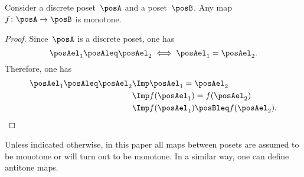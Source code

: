 \begin{lemma}
  Consider a discrete poset~$\posA$ and a poset~$\posB$. Any map~$f\colon \posA\to \posB$ is monotone.
\end{lemma}
\begin{proof}
  Since~$\posA$ is a discrete poset, one has
  \begin{equation}
    \posAel_1\posAleq \posAel_2 \iff \posAel_1=\posAel_2.
  \end{equation}
  Therefore, one has
  \begin{equation}
    \begin{aligned}
      \posAel_1\posAleq \posAel_2 &\Imp \posAel_1=\posAel_2\\
      &\Imp f(\posAel_1)=f(\posAel_2)\\
      &\Imp f(\posAel_1)\posBleq f(\posAel_2).
    \end{aligned}
  \end{equation}
\end{proof}
Unless indicated otherwise, in this paper all maps between posets are assumed to be monotone or will turn out to be monotone. In a similar way, one can define antitone maps.


